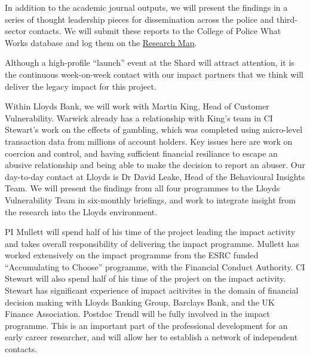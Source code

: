 \documentclass[11pt, a4paper]{article}
\newcommand{\TM}[1] {{\textcolor{orange}{#1}}}
\begin{document}
In addition to the academic journal outputs, we will present the findings in a series of thought leadership pieces for dissemination across the police and third-sector contacts. We will submit these reports to the College of Police What Works database and log them on the \href{https://whatworks.college.police.uk/Research/Research-Map/Pages/Research-Map.aspx}{Research Map}.

Although a high-profile ``launch'' event at the Shard will attract attention, it is the continuous week-on-week contact with our impact partners that we think will deliver the legacy impact for this project.


Within Lloyds Bank, we will work with Martin King, Head of Customer Vulnerability. Warwick already has a relationship with King's team in CI Stewart's work on the effects of gambling, which was completed using micro-level transaction data from millions of account holders. Key issues here are work on coercion and control, and having sufficient financial resiliance to escape an abusive relationship and being able to make the decision to report an abuser. Our day-to-day contact at Lloyds is Dr David Leake, Head of the Behavioural Insights Team. We will present the findings from all four programmes to the Lloyds Vulnerability Team in six-monthly briefings, and work to integrate insight from the research into the Lloyds environment. 









PI Mullett will spend half of his time of the project leading the impact activity and takes overall responsibility of delivering the impact programme. Mullett has worked extensively on the impact programme from the ESRC funded ``Accumulating to Choose'' programme, with the Financial Conduct Authority. CI Stewart will also spend half of his time of the project on the impact activity. Stewart has significant experience of impact acitivites in the domain of financial decision making with Lloyds Banking Group, Barclays Bank, and the UK Finance Association. Postdoc Trendl will be fully involved in the impact programme. This is an important part of the professional development for an early career researcher, and will allow her to establish a network of independent contacts. 
\end{document}
